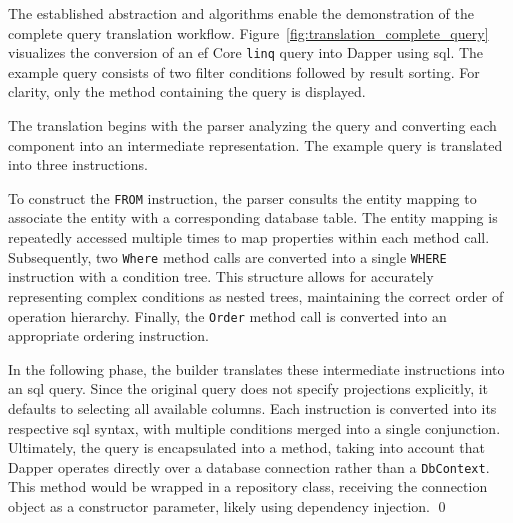 
\begin{example}
\small
The established abstraction and algorithms enable the demonstration of the complete query translation workflow. Figure~\ref{fig:translation_complete_query} visualizes the conversion of an \acrshort{ef} Core \texttt{linq} query into Dapper using \acrshort{sql}. The example query consists of two filter conditions followed by result sorting. For clarity, only the method containing the query is displayed. 

The translation begins with the parser analyzing the query and converting each component into an intermediate representation. The example query is translated into three instructions.

To construct the \texttt{FROM} instruction, the parser consults the entity mapping to associate the entity with a corresponding database table. The entity mapping is repeatedly accessed multiple times to map  properties within each method call. Subsequently, two \texttt{Where} method calls are converted into a single \texttt{WHERE} instruction with a condition tree. This structure allows for accurately representing complex conditions as nested trees, maintaining the correct order of operation hierarchy. Finally, the \texttt{Order} method call is converted into an appropriate ordering instruction.

In the following phase, the builder translates these intermediate instructions into an \acrshort{sql} query. Since the original query does not specify projections explicitly, it defaults to selecting all available columns. Each instruction is converted into its respective \acrshort{sql} syntax, with multiple conditions merged into a single conjunction. Ultimately, the query is encapsulated into a method, taking into account that Dapper operates directly over a database connection rather than a \texttt{DbContext}. This method would be wrapped in a repository class, receiving the connection object as a constructor parameter, likely using dependency injection. 
\qed
\end{example}

